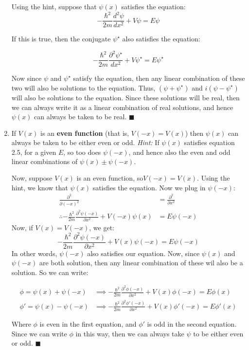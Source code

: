 \documentclass{article}
\begin{document}
\begin{enumerate}[label=(\alph*)]
    \begin{solution}
        Using the hint, suppose that $\psi(x)$ satisfies the \schrodinger equation:
        \[ -\frac{\hbar^2}{2m}\frac{d^2\psi}{dx^2} + V\psi = E\psi\]

        If this is true, then the conjugate $\psi^\star$ also satisfies the \schrodinger equation:

         \[-\frac{\hbar^2}{2m}\frac{\partial^2\psi^{\star}}{dx^2} + V\psi^\star = E\psi^{\star}\]

         Now since $\psi$ and $\psi^\star$ satisfy the \schrodinger equation, then any linear combination of these two will also be solutions to the \schrodinger equation. Thus, $(\psi + \psi^{\star})$ and $i(\psi - \psi^{\star})$ will also be solutions to the \schrodinger equation. Since these solutions will be real, then we can always write it as a linear combination of real solutions, and hence $\psi(x)$ can always be taken to be real. $\blacksquare$

    \end{solution}
    \item If $V(x)$ is an \textbf{even function} (that is, $V(-x) = V(x)$) then $\psi(x)$ can always be taken to be either even or odd. \textit{Hint:} If $\psi(x)$ satisfies equation 2.5, for a given $E$, so too does $\psi(-x)$, and hence also the even and odd linear combinations of $\psi(x) \pm \psi(-x)$.
    
    \begin{solution}
        Now, suppose $V(x)$ is an even function, so$V(-x) = V(x)$. Using the hint, we know that $\psi(x)$ satisfies the \schrodinger equation. Now we plug in $\psi(-x)$:
        \begin{align*}
          \frac{\partial^2}{\partial(-x)^2} &= \frac{\partial^2}{\partial x^2}\\
          \therefore -\frac{\hbar^2}{2m}\frac{\partial^2\psi(-x)}{\partial x^2} + V(-x)\psi(x) &= E\psi(-x)
        \end{align*}
        Now, if $V(x) = V(-x)$, we get:
        $$-\frac{\hbar^2}{2m}\frac{\partial^2\psi(-x)}{\partial x^2} + V(x)\psi(-x) = E\psi(-x)$$
        In other words, $\psi(-x)$ also satisfies our \schrodinger equation. Now, since $\psi(x)$ and $\psi(-x)$ are both solution, then any linear combination of these wil also be a solution. So we can write:

        \begin{align*}
          \phi = \psi(x) + \psi(-x) &\implies -\frac{\hbar^2}{2m}\frac{\partial^2\phi(-x)}{\partial x^2} + V(x)\phi(-x) = E\phi(x)\\
          \phi' = \psi(x) - \psi(-x) &\implies -\frac{\hbar^2}{2m}\frac{\partial^2\phi'(-x)}{\partial x^2} + V(x)\phi'(-x) = E\phi'(x)
        \end{align*}

        Where $\phi$ is even in the first equation, and $\phi'$ is odd in the second equation. Since we can write $\phi$ in this way, then we can always take $\psi$ to be either even or odd. $\blacksquare$ 
    \end{solution}
\end{enumerate}
\end{document}
